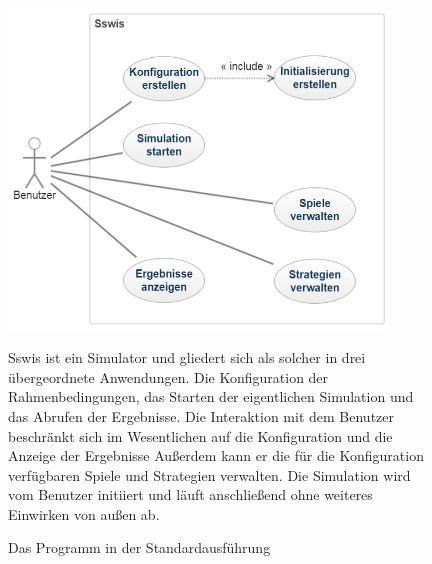 \begin{figure}[htbp]
{\centering 
\includegraphics[width=0.9\textwidth]{Anwendungsfalldiagramme/usecase_sswis.png}
\caption{Das Programm in der Standardausführung} }
\bigskip
Sswis ist ein Simulator und gliedert sich als solcher in drei übergeordnete Anwendungen. Die Konfiguration der Rahmenbedingungen, das Starten der eigentlichen Simulation und das Abrufen der Ergebnisse. Die Interaktion mit dem Benutzer beschränkt sich im Wesentlichen auf die Konfiguration und die Anzeige der Ergebnisse Außerdem kann er die für die Konfiguration verfügbaren Spiele und Strategien verwalten\footnotemark. Die Simulation wird vom Benutzer initiiert und läuft anschließend ohne weiteres Einwirken von außen ab.

\end{figure}


